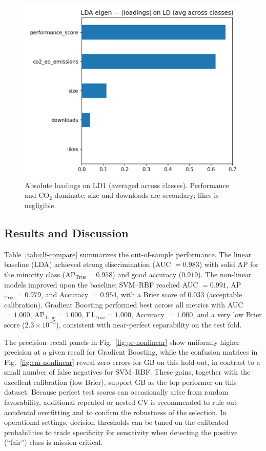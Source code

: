 \documentclass[journal]{IEEEtran}
\begin{document}
\begin{figure}[H]
	\centering
	\includegraphics[width=.72\linewidth]{assets/LDA-eigen_loadings_abs_bar.png}
	\caption{Absolute loadings on LD1 (averaged across classes). Performance and CO$_2$ dominate; size and downloads are secondary; likes is negligible.}
	\label{fig:lda-loadings}
\end{figure}


\subsection{Results and Discussion}
Table~\ref{tab:clf-compare} summarizes the out-of-sample performance. The linear
baseline (LDA) achieved strong discrimination (AUC $=0.983$) with solid AP for the
minority class (AP$_{\text{True}}=0.958$) and good accuracy ($0.919$). The
non-linear models improved upon the baseline: SVM–RBF reached AUC $=0.991$,
AP$_{\text{True}}=0.979$, and Accuracy $=0.954$, with a Brier score of $0.033$
(acceptable calibration). Gradient Boosting performed best across all metrics with
AUC $=1.000$, AP$_{\text{True}}=1.000$, F1$_{\text{True}}=1.000$,
Accuracy $=1.000$, and a very low Brier score ($2.3\times10^{-5}$), consistent with
near-perfect separability on the test fold.

The precision–recall panels in Fig.~\ref{fig:pr-nonlinear} show uniformly higher
precision at a given recall for Gradient Boosting, while the confusion matrices in
Fig.~\ref{fig:cm-nonlinear} reveal zero errors for GB on this hold-out, in contrast
to a small number of false negatives for SVM–RBF. These gains, together with the
excellent calibration (low Brier), support GB as the top performer on this dataset.
Because perfect test scores can occasionally arise from random favorability,
additional repeated or nested CV is recommended to rule out accidental overfitting
and to confirm the robustness of the selection. In operational settings, decision
thresholds can be tuned on the calibrated probabilities to trade specificity for
sensitivity when detecting the positive (``fair'') class is mission-critical.
\end{document}
